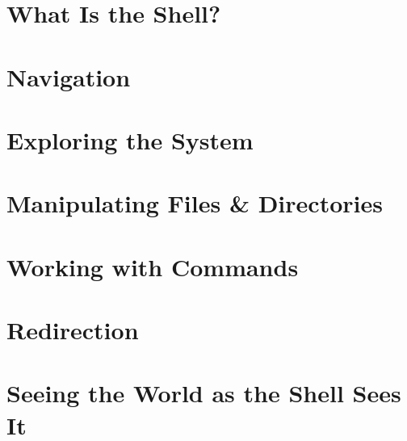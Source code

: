 \documentclass[oneside]{book}
\numberwithin{equation}{section}
\begin{document}

\section{What Is the Shell?}


\section{Navigation}


\section{Exploring the System}


\section{Manipulating Files \& Directories}


\section{Working with Commands}


\section{Redirection}


\section{Seeing the World as the Shell Sees It}

\end{document}
